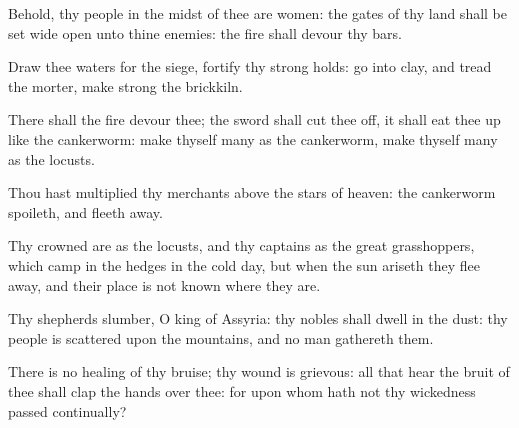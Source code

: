 \verse Behold, thy people in the midst of thee are women: the gates of thy land shall be set wide open unto thine enemies: the fire shall devour thy bars.

\verse Draw thee waters for the siege, fortify thy strong holds: go into clay, and tread the morter, make strong the brickkiln.

\verse There shall the fire devour thee; the sword shall cut thee off, it shall eat thee up like the cankerworm: make thyself many as the cankerworm, make thyself many as the locusts.

\verse Thou hast multiplied thy merchants above the stars of heaven: the cankerworm spoileth, and fleeth away.

\verse Thy crowned are as the locusts, and thy captains as the great grasshoppers, which camp in the hedges in the cold day, but when the sun ariseth they flee away, and their place is not known where they are.

\verse Thy shepherds slumber, O king of Assyria: thy nobles shall dwell in the dust: thy people is scattered upon the mountains, and no man gathereth them.

\verse There is no healing of thy bruise; thy wound is grievous: all that hear the bruit of thee shall clap the hands over thee: for upon whom hath not thy wickedness passed continually?

